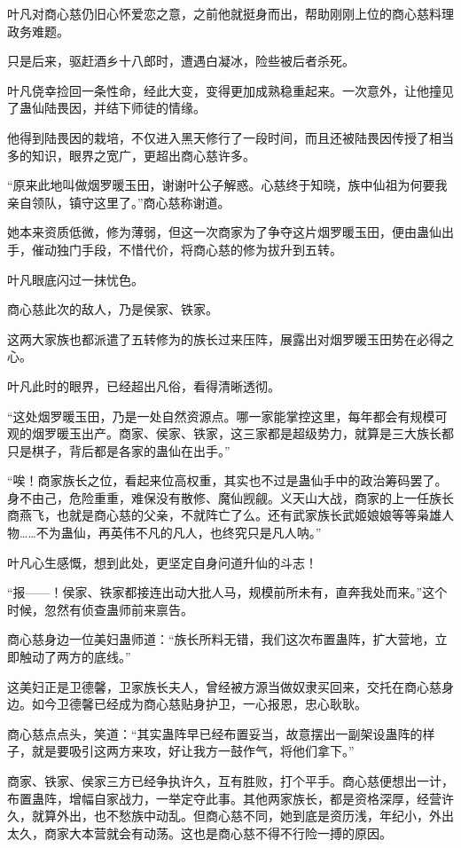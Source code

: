 \begin{this_body}
叶凡对商心慈仍旧心怀爱恋之意，之前他就挺身而出，帮助刚刚上位的商心慈料理政务难题。

只是后来，驱赶酒乡十八郎时，遭遇白凝冰，险些被后者杀死。

叶凡侥幸捡回一条性命，经此大变，变得更加成熟稳重起来。一次意外，让他撞见了蛊仙陆畏因，并结下师徒的情缘。

他得到陆畏因的栽培，不仅进入黑天修行了一段时间，而且还被陆畏因传授了相当多的知识，眼界之宽广，更超出商心慈许多。

“原来此地叫做烟罗暖玉田，谢谢叶公子解惑。心慈终于知晓，族中仙祖为何要我亲自领队，镇守这里了。”商心慈称谢道。

她本来资质低微，修为薄弱，但这一次商家为了争夺这片烟罗暖玉田，便由蛊仙出手，催动独门手段，不惜代价，将商心慈的修为拔升到五转。

叶凡眼底闪过一抹忧色。

商心慈此次的敌人，乃是侯家、铁家。

这两大家族也都派遣了五转修为的族长过来压阵，展露出对烟罗暖玉田势在必得之心。

叶凡此时的眼界，已经超出凡俗，看得清晰透彻。

“这处烟罗暖玉田，乃是一处自然资源点。哪一家能掌控这里，每年都会有规模可观的烟罗暖玉出产。商家、侯家、铁家，这三家都是超级势力，就算是三大族长都只是棋子，背后都是各家的蛊仙在出手。”

“唉！商家族长之位，看起来位高权重，其实也不过是蛊仙手中的政治筹码罢了。身不由己，危险重重，难保没有散修、魔仙觊觎。义天山大战，商家的上一任族长商燕飞，也就是商心慈的父亲，不就阵亡了么。还有武家族长武姬娘娘等等枭雄人物……不为蛊仙，再英伟不凡的凡人，也终究只是凡人呐。”

叶凡心生感慨，想到此处，更坚定自身问道升仙的斗志！

“报——！侯家、铁家都接连出动大批人马，规模前所未有，直奔我处而来。”这个时候，忽然有侦查蛊师前来禀告。

商心慈身边一位美妇蛊师道：“族长所料无错，我们这次布置蛊阵，扩大营地，立即触动了两方的底线。”

这美妇正是卫德馨，卫家族长夫人，曾经被方源当做奴隶买回来，交托在商心慈身边。如今卫德馨已经成为商心慈贴身护卫，一心报恩，忠心耿耿。

商心慈点点头，笑道：“其实蛊阵早已经布置妥当，故意摆出一副架设蛊阵的样子，就是要吸引这两方来攻，好让我方一鼓作气，将他们拿下。”

商家、铁家、侯家三方已经争执许久，互有胜败，打个平手。商心慈便想出一计，布置蛊阵，增幅自家战力，一举定夺此事。其他两家族长，都是资格深厚，经营许久，就算外出，也不愁族中动乱。但商心慈不同，她到底是资历浅，年纪小，外出太久，商家大本营就会有动荡。这也是商心慈不得不行险一搏的原因。


\end{this_body}
